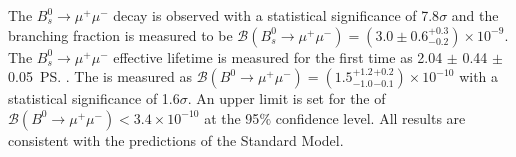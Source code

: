 The $B_{s}^{0} \to \mu^{+} \mu^{-}$ decay is observed with a statistical significance of 7.8$\sigma$ and the branching fraction is measured to be $\mathcal{B}(B_{s}^{0} \to \mu^{+} \mu^{-}) = (3.0 \pm 0.6^{ +0.3}_{ -0.2}) \times 10^{-9}$. The $B_{s}^{0} \to \mu^{+} \mu^{-}$ effective lifetime is measured for the first time as 2.04 $\pm$ 0.44 $\pm$ 0.05~\ps.
The \bdmumu \BF is measured as $\mathcal{B}(B^{0} \to \mu^{+} \mu^{-}) = (1.5^{+1.2}_{-1.0}^{+0.2}_{-0.1})\times 10^{-10}$ with a statistical significance of 1.6$\sigma$. An upper limit is set for the \BF of $\mathcal{B}(B^{0} \to \mu^{+} \mu^{-})< 3.4 \times 10^{-10}$ at the 95$\%$ confidence level. All results are consistent with the predictions of the Standard Model.                                                                  




